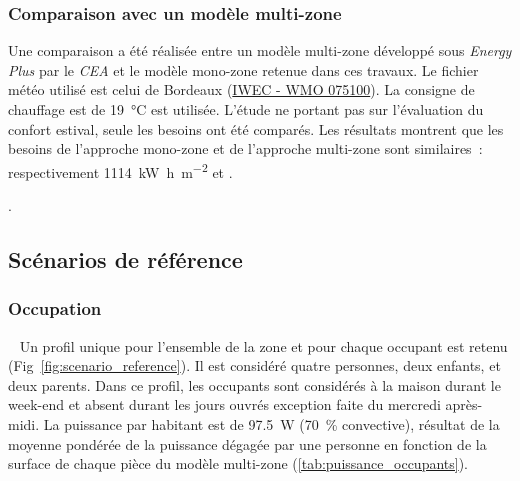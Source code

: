 \subsubsection{Comparaison avec un modèle multi-zone} %
\label{ssub:comparaison_avec_un_modele_multi_zone}
Une comparaison a été réalisée
entre un modèle multi-zone développé sous \emph{Energy Plus} par le
\emph{CEA} et le modèle mono-zone retenue dans ces travaux. Le fichier météo utilisé est celui de
Bordeaux (\href{https://www.energyplus.net/weather-download/europe_wmo_region_6/FRA//FRA_Bordeaux.075100_IWEC/all}{IWEC - WMO 075100}).
La consigne de chauffage est de \SI{19}{\celsius} est utilisée. L’étude ne portant pas sur l’évaluation du confort estival,
seule les besoins ont été comparés. Les résultats montrent que les
besoins de l’approche mono-zone et de l’approche multi-zone sont similaires~:
respectivement \SI[per-mode=symbol]{1114}{\kilo\watt\hour\per\meter\squared} et
.

.


\subsection{Scénarios de référence} %
\label{sub:scénarios_de_référence}
\subsubsection{Occupation} %
\label{ssub:profil_d_occupation}
~
Un profil unique pour l’ensemble de la zone et pour chaque occupant est retenu
(Fig~\ref{fig:scenario_reference}). Il est considéré quatre personnes, deux enfants, et deux parents. Dans ce profil,
les occupants sont considérés à la maison durant le week-end et absent durant les jours
ouvrés exception faite du mercredi après-midi.
La puissance par habitant est de \SI{97.5}{\watt} (\SI{70}{\percent} convective), résultat
de la moyenne pondérée de la puissance dégagée par une personne en fonction de la surface
de chaque pièce du modèle multi-zone (\ref{tab:puissance_occupants}).

